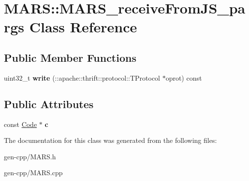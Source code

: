 \hypertarget{classMARS_1_1MARS__receiveFromJS__pargs}{}\section{M\+A\+RS\+:\+:M\+A\+R\+S\+\_\+receive\+From\+J\+S\+\_\+pargs Class Reference}
\label{classMARS_1_1MARS__receiveFromJS__pargs}
\subsection*{Public Member Functions}
\begin{DoxyCompactItemize}
\item 
\mbox{\label{classMARS_1_1MARS__receiveFromJS__pargs_a5fa88497dd2bc9ccb62ab69799fe2a57}} 
uint32\+\_\+t {\bfseries write} (\+::apache\+::thrift\+::protocol\+::\+T\+Protocol $\ast$oprot) const
\end{DoxyCompactItemize}
\subsection*{Public Attributes}
\begin{DoxyCompactItemize}
\item 
\mbox{\label{classMARS_1_1MARS__receiveFromJS__pargs_afa4e43720c348fc1573ab8385d60cc7d}} 
const \hyperlink{classMARS_1_1Code}{Code} $\ast$ {\bfseries c}
\end{DoxyCompactItemize}


The documentation for this class was generated from the following files\+:\begin{DoxyCompactItemize}
\item 
gen-\/cpp/M\+A\+R\+S.\+h\item 
gen-\/cpp/M\+A\+R\+S.\+cpp\end{DoxyCompactItemize}
